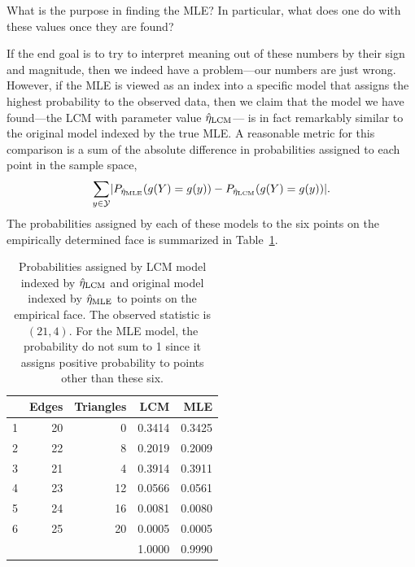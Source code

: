 What is the purpose in finding the MLE?  In particular, what does one do with these values once they are found?

If the end goal is to try to interpret meaning out of these numbers by their sign and  
magnitude, then we indeed have a problem---our numbers are just wrong.  
However, if the MLE is viewed as an 
index into a specific model that assigns the highest probability to the observed data,
then we claim that the model we have found---the LCM with parameter value $\etaLCM$---
is in fact remarkably similar to the original model indexed by the true MLE.  A 
reasonable metric for this comparison is a sum of the absolute difference in 
probabilities assigned to each point in the sample space,
\begin{align*}
	\sum_{y \in {\mathcal Y}} \lvert  P_{\hat{\eta}_{\textrm{MLE}}}(g(Y) =g(y) ) -  P_{\hat{\eta}_{\textrm{LCM}}}(g(Y) = g(y))   \rvert.
\end{align*}
The probabilities assigned by each of these models to the six points on the 
empirically determined face is summarized in Table~\ref{T:LCMvsMLE}.

\begin{table}[h!] 
\begin{center}
\caption[Comparison of probabilities assigned by LCM model indexed by $\etaLCM$ and 
original model indexed by $\etaMLE$ to empirical face]
{Probabilities assigned by LCM model indexed by $\etaLCM$ and original model 
indexed by $\etaMLE$ to points on the empirical face.  The observed statistic is 
$(21,4)$.  For the MLE model, the probability do not sum to 1 since it assigns 
positive probability to points other than these six.}

\begin{tabular}{rrrrr}
\\  \hline
 & Edges & Triangles & LCM & MLE \\ 
  \hline
1 & 20 & 0 & 0.3414 & 0.3425 \\ 
  2 & 22 & 8 & 0.2019 & 0.2009 \\ 
  3 & 21 & 4 & 0.3914 & 0.3911 \\ 
  4 & 23 & 12 & 0.0566 & 0.0561 \\ 
  5 & 24 & 16 & 0.0081 & 0.0080 \\ 
  6 & 25 & 20 & 0.0005 & 0.0005 \\ 
   \hline
   &  &  & 1.0000 & 0.9990 \\ 
\end{tabular}\label{T:LCMvsMLE}
\end{center}
\end{table}

